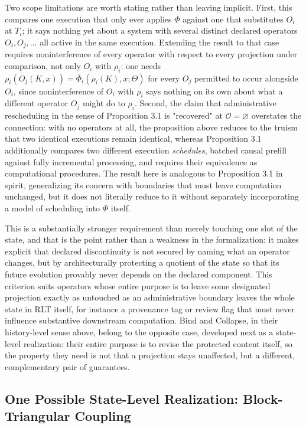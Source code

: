 \documentclass[11pt]{article}
\begin{document}
Two scope limitations are worth stating rather than leaving implicit. First, this compares one execution that only ever applies $\Phi$ against one that substitutes $O_i$ at $T_i$; it says nothing yet about a system with several distinct declared operators $O_i, O_j, \ldots$ all active in the same execution. Extending the result to that case requires noninterference of every operator with respect to every projection under comparison, not only $O_i$ with $\rho_i$: one needs $\rho_i(O_j(K,x)) = \bar\Phi_i(\rho_i(K),x;\Theta)$ for every $O_j$ permitted to occur alongside $O_i$, since noninterference of $O_i$ with $\rho_i$ says nothing on its own about what a different operator $O_j$ might do to $\rho_i$. Second, the claim that administrative rescheduling in the sense of Proposition 3.1 is "recovered" at $\mathcal O = \varnothing$ overstates the connection: with no operators at all, the proposition above reduces to the truism that two identical executions remain identical, whereas Proposition 3.1 additionally compares two different execution \emph{schedules}, batched causal prefill against fully incremental processing, and requires their equivalence as computational procedures. The result here is analogous to Proposition 3.1 in spirit, generalizing its concern with boundaries that must leave computation unchanged, but it does not literally reduce to it without separately incorporating a model of scheduling into $\Phi$ itself.

This is a substantially stronger requirement than merely touching one slot of the state, and that is the point rather than a weakness in the formalization: it makes explicit that declared discontinuity is not secured by naming what an operator changes, but by architecturally protecting a quotient of the state so that its future evolution provably never depends on the declared component. This criterion suits operators whose entire purpose is to leave some designated projection exactly as untouched as an administrative boundary leaves the whole state in RLT itself, for instance a provenance tag or review flag that must never influence substantive downstream computation. Bind and Collapse, in their history-level sense above, belong to the opposite case, developed next as a state-level realization: their entire purpose is to revise the protected content itself, so the property they need is not that a projection stays unaffected, but a different, complementary pair of guarantees.

\subsection{One Possible State-Level Realization: Block-Triangular Coupling}
\end{document}
